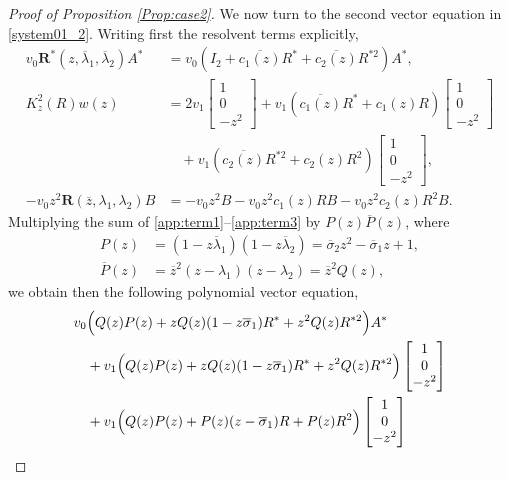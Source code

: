 \documentclass[10pt,a4paper]{amsart}
\begin{document}
\begin{proof}[Proof of Proposition \ref{Prop:case2}]
	We now turn to the second vector equation in \eqref{system01_2}. Writing first the resolvent terms explicitly,
	\begin{align}
		v_0\mathbf{R}^*(z, \overline{\lambda}_1, \overline{\lambda}_2)A^* &= v_0 \left( I_2 + \overline{c_1(z)} R^* + \overline{c_2(z)} R^{*2} \right) A^*, \label{app:term1} \\
		K_z^2(R) w(z) &= 2v_1 \begin{bmatrix} 1 \\ 0 \\ -z^2 \end{bmatrix} + v_1 \left( \overline{c_1(z)} R^* + c_1(z) R \right) \begin{bmatrix} 1 \\ 0 \\ -z^2 \end{bmatrix} \nonumber \\
		&\quad + v_1 \left( \overline{c_2(z)} R^{*2} + c_2(z) R^2 \right) \begin{bmatrix} 1 \\ 0 \\ -z^2 \end{bmatrix}, \label{app:term2} \\
		-v_0 z^2 \mathbf{R}(\overline{z}, \lambda_1, \lambda_2) B &= -v_0 z^2 B - v_0 z^2 c_1(z) R B - v_0 z^2 c_2(z) R^2 B. \label{app:term3}
	\end{align}
	Multiplying the sum of \eqref{app:term1}--\eqref{app:term3} by $P(z)\overline{P}(z)$, where
	\begin{align*}
		P(z) &= (1-z\overline{\lambda}_1)(1-z\overline{\lambda}_2) = \overline{\sigma}_2 z^2 - \overline{\sigma}_1 z + 1, \\
		\overline{P}(z) &= \overline{z}^2 (z-\lambda_1)(z-\lambda_2) = \overline{z}^2 Q(z),
	\end{align*}
we obtain then the following polynomial vector equation,
	\begin{align}\label{app:vector_cleared}
		v_0 &\Bigl( Q(z) P(z)  +  zQ(z) (1 - z\overline{\sigma}_1) R^*  +  z^2Q(z) R^{*2}\Bigr)   A^* \nonumber \\
		&+ v_1 \Bigl( Q(z) P(z)  +  zQ(z) (1 - z\overline{\sigma}_1) R^*  +  z^2Q(z) R^{*2}\Bigr)  \begin{bmatrix} 1 \\ 0 \\ -z^2 \end{bmatrix} \\
		&+ v_1 \Bigl( Q(z) P(z)+ P(z) (z - \overline{\sigma}_1) R +P(z) R^2 \Bigr)  \begin{bmatrix} 1 \\ 0 \\ -z^2 \end{bmatrix} \nonumber \\

\end{align}
\end{proof}
\end{document}
